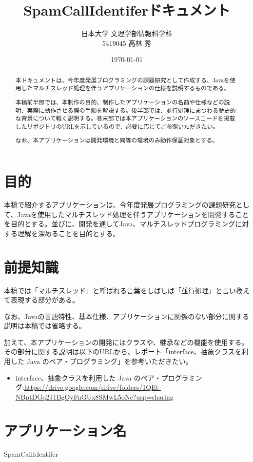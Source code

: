 \documentclass[dvipdfmx, titlepage]{jsarticle}
\title{SpamCallIdentiferドキュメント}
\date{\today}
\author{日本大学 文理学部情報科学科\\5419045 高林 秀}
\begin{document}
\maketitle

\begin{abstract}
本ドキュメントは、今年度発展プログラミングの課題研究として作成する、Javaを使用したマルチスレッド処理を伴うアプリケーションの仕様を説明するものである。\par
本稿前半部では、本制作の目的、制作したアプリケーションの名前や仕様などの説明、実際に動作させる際の手順を解説する。後半部では、並行処理にまつわる歴史的な背景について軽く説明する。巻末部では本アプリケーションのソースコードを掲載したリポジトリのURLを示しているので、必要に応じてご参照いただきたい。\par
なお、本アプリケーションは開発環境と同等の環境のみ動作保証対象とする。
\end{abstract}

\section{目的}
本稿で紹介するアプリケーションは、今年度発展プログラミングの課題研究として、Javaを使用したマルチスレッド処理を伴うアプリケーションを開発することを目的とする。並びに、開発を通してJava、マルチスレッドプログラミングに対する理解を深めることを目的とする。\par
\section{前提知識}
本稿では「マルチスレッド」と呼ばれる言葉をしばしば「並行処理」と言い換えて表現する部分がある。\par
なお、Javaの言語特性、基本仕様、アプリケーションに関係のない部分に関する説明は本稿では省略する。\par
加えて、本アプリケーションの開発にはクラスや、継承などの機能を使用する。その部分に関する説明は以下のURLから、レポート「interface、抽象クラスを利用した Java のペア・プログラミング」を参考いただきたい。
\begin{itemize}
  \item interface、抽象クラスを利用した Java のペア・プログラミング:\url{https://drive.google.com/drive/folders/1QEt-NBptDGq2J1BgOyFnGUx8SMwL5oNc?usp=sharing}
\end{itemize}
\section{アプリケーション名}
SpamCallIdentifer
\end{document}
